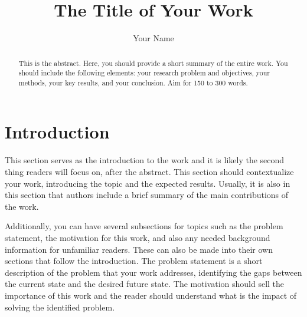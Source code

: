 \documentclass[sigconf,balance,nonacm,authordraft]{acmart}
\begin{document}
\begin{acronym}
\end{acronym}

\title{The Title of Your Work}

\author{Your Name}


\begin{abstract}
This is the abstract. Here, you should provide a short summary of the entire work. You should include the following elements: your research problem and objectives, your methods, your key results, and your conclusion. Aim for 150 to 300 words.
\end{abstract}


\maketitle

\section{Introduction}
\label{sec:intro}
This section serves as the introduction to the work and it is likely the second thing readers will focus on, after the abstract. This section should contextualize your work, introducing the topic and the expected results. Usually, it is also in this section that authors include a brief summary of the main contributions of the work.

Additionally, you can have several subsections for topics such as the problem statement, the motivation for this work, and also any needed background information for unfamiliar readers. These can also be made into their own sections that follow the introduction. The problem statement is a short description of the problem that your work addresses, identifying the gaps between the current state and the desired future state. The motivation should sell the importance of this work and the reader should understand what is the impact of solving the identified problem.
\end{document}
